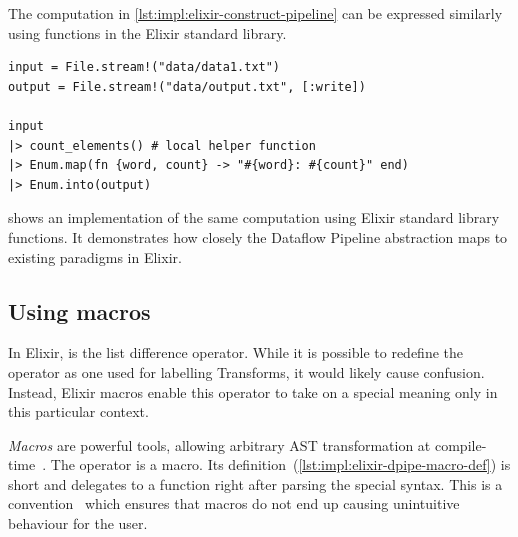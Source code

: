 \begin{listing}[h]
	\caption[An implementation of the computation in \cref{lst:impl:elixir-construct-pipeline} using standard sequential functions.]{The computation in \cref{lst:impl:elixir-construct-pipeline} can be expressed similarly using functions in the Elixir standard library.}
	\label{lst:impl:elixir-normal-comparison}
	\begin{verbatim}
input = File.stream!("data/data1.txt")
output = File.stream!("data/output.txt", [:write])

input
|> count_elements() # local helper function
|> Enum.map(fn {word, count} -> "#{word}: #{count}" end)
|> Enum.into(output)
	\end{verbatim}
\end{listing}

 shows an implementation of the same computation using Elixir standard library functions.
It demonstrates how closely the Dataflow Pipeline abstraction maps to existing paradigms in Elixir.

\subsection{Using macros}

In Elixir, \exs{--} is the list difference operator.
While it is possible to redefine the \exs{--} operator as one used for labelling Transforms, it would likely cause confusion.
Instead, Elixir macros enable this operator to take on a special meaning only in this particular context.

\emph{Macros} are powerful tools, allowing arbitrary AST transformation at compile-time~\cite[p.~13]{Elixir-Metaprogramming}.
The \exs{~>} operator is a macro.
Its definition~(\cref{lst:impl:elixir-dpipe-macro-def}) is short and delegates to a function right after parsing the special syntax.
This is a convention~\cite[p.~7]{Elixir-Metaprogramming} which ensures that macros do not end up causing unintuitive behaviour for the user.

